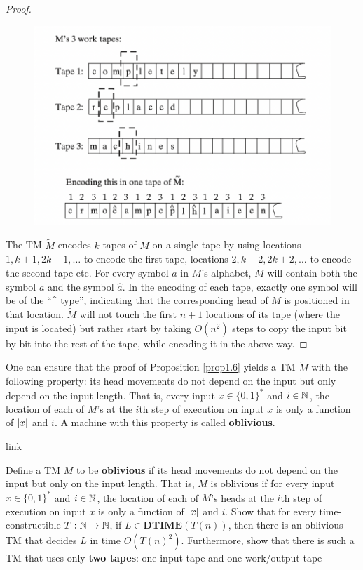 \documentclass[11pt]{article}
\def \DTIME {\textbf{DTIME}}
\begin{document}
\begin{proof}
\begin{figure}[htbp]
\centering
\includegraphics[width=.6\textwidth]{./1.png}
\label{}
\end{figure}
The TM \(\tilde{M}\) encodes \(k\) tapes of \(M\) on a single tape by using
locations \(1,k+1,2k+1,\dots\) to encode the first tape, locations \(2,k+2,2k+2,\dots\) to
encode the second tape etc. For every symbol \(a\) in \(M\)'s alphabet, \(\tilde{M}\) will
contain both the symbol \(a\) and the symbol \(\hat{a}\). In the encoding of each tape, exactly
one symbol will be of the ``\^{} type'', indicating that the corresponding head of \(M\) is
positioned in that location. \(\tilde{M}\) will not touch the first \(n+1\) locations of its
tape (where the input is located) but rather start by taking \(O(n^2)\) steps to copy the input
bit by bit into the rest of the tape, while encoding it in the above way.
\end{proof}

\begin{remark}
One can ensure that the proof of Proposition \ref{prop1.6} yields a TM \(\tilde{M}\) with the
following property: its head movements do not depend on the input but only depend on the input
length. That is, every input \(x\in\{0,1\}^*\) and \(i\in\mathbb{N}\), the location of each of \(M\)'s
at the \(i\)th step of execution on input \(x\) is only a function of \(\abs{x}\) and \(i\). A
machine with this property is called \textbf{oblivious}.
\end{remark}

\href{https://www.youtube.com/watch?v=LZmFYR2q4g4}{link}

\begin{exercise}
\label{ex1.5}
Define a TM \(M\) to be \textbf{oblivious} if its head movements do not depend on the input but only on
the input length. That is, \(M\) is oblivious if for every input \(x\in\{0,1\}^*\) and \(i\in\mathbb{N}\), the
location of each of \(M\)'s heads at the \(i\)th step of execution on input \(x\) is only a
function of \(\abs{x}\) and \(i\). Show that for every time-constructible \(T:\mathbb{N}\to\mathbb{N}\),
if \(L\in\DTIME(T(n))\), then there is an oblivious TM that decides \(L\) in time \(O(T(n)^2)\).
Furthermore, show that there is such a TM that uses only \textbf{two tapes}: one input tape and one
work/output tape
\end{exercise}
\end{document}
